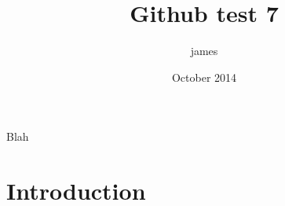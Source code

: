\documentclass{article}
\title{Github test 7}
\author{james }
\date{October 2014}
\begin{document}
\maketitle

Blah

\section{Introduction}
\end{document}
